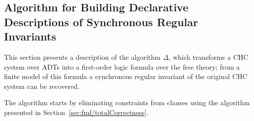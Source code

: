 \subsection{Algorithm for Building Declarative Descriptions of Synchronous Regular Invariants}
This section presents a description of the algorithm $\Delta$, which transforms a CHC system over ADTs into a first-order logic formula over the free theory; from a finite model of this formula a synchronous regular invariant of the original CHC system can be recovered.

The algorithm starts by eliminating constraints from clauses using the algorithm presented in Section~\ref{sec:fmf/totalCorrectness}.

